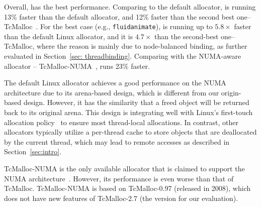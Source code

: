 Overall, \NM{} has the best performance. Comparing to the default allocator, \NM{} is running 13\% faster than the default allocator, and 12\% faster than the second best one--TcMalloc~\cite{tcmalloc}. For the best case (e.g., \texttt{fluidanimate}), \NM{} is running up to $5.8\times$ faster than the default Linux allocator, and it is $4.7\times$ than the second-best one--TcMalloc, where the reason is mainly due to node-balanced binding, as further evaluated in Section~\ref{sec: threadbinding}.  Comparing with the NUMA-aware allocator -- TcMalloc-NUMA~\cite{tcmallocnew}, \NM{} runs 23\% faster.

The default Linux allocator achieves a good performance on the NUMA architecture due to its arena-based design, which is different from our origin-based design. However, it has the similarity that a freed object will be returned back to its original arena.
This design is integrating well with Linux's first-touch allocation policy~\cite{Lameter:2013:NO:2508834.2513149} to ensure most thread-local allocations. 
In contrast, other allocators typically utilize a per-thread cache to store objects that are deallocated by the current thread, which may lead to remote accesses as described in Section~\ref{sec:intro}. 

 TcMalloc-NUMA is the only available allocator that is claimed to support the NUMA architecture~\cite{tcmallocnew}. However, its performance is even worse than that of TcMalloc. TcMalloc-NUMA is based on TcMalloc-0.97 (released in 2008), which does not have new features of TcMalloc-2.7 (the version for our evaluation). 
  


